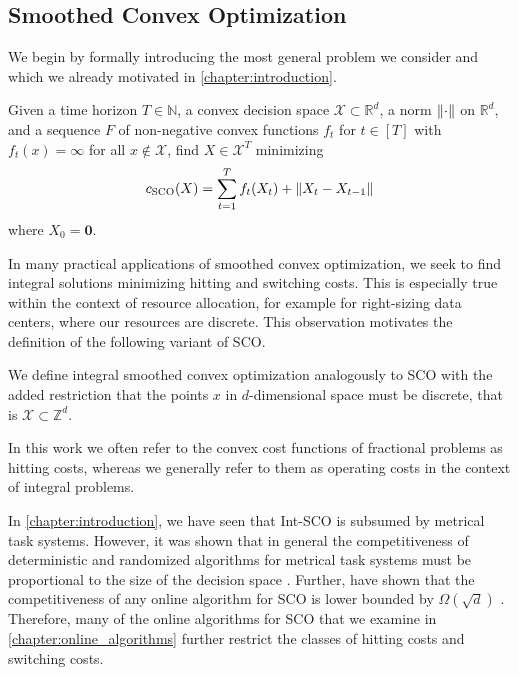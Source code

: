 \subsection{Smoothed Convex Optimization}

We begin by formally introducing the most general problem we consider and which we already motivated in \autoref{chapter:introduction}.

\begin{problem}
Given a time horizon $T \in \mathbb{N}$, a convex decision space $\mathcal{X} \subset \mathbb{R}^d$, a norm $\lVert\cdot\rVert$ on $\mathbb{R}^d$, and a sequence $F$ of non-negative convex functions $f_t$ for $t \in [T]$ with $f_t(x) = \infty$ for all $x \not\in \mathcal{X}$, find $X \in \mathcal{X}^T$ minimizing \begin{align*}
    c_{\text{SCO}}(X) = \sum_{t=1}^T f_t(X_t) + \lVert X_t - X_{t-1}\rVert
\end{align*}
where $X_0 = \mathbf{0}$.
\end{problem}

In many practical applications of smoothed convex optimization, we seek to find integral solutions minimizing hitting and switching costs. This is especially true within the context of resource allocation, for example for right-sizing data centers, where our resources are discrete. This observation motivates the definition of the following variant of SCO.

\begin{problem}
We define integral smoothed convex optimization analogously to SCO with the added restriction that the points $x$ in $d$-dimensional space must be discrete, that is $\mathcal{X} \subset \mathbb{Z}^d$.
\end{problem}

In this work we often refer to the convex cost functions of fractional problems as hitting costs, whereas we generally refer to them as operating costs in the context of integral problems.

In \autoref{chapter:introduction}, we have seen that Int-SCO is subsumed by metrical task systems. However, it was shown that in general the competitiveness of deterministic and randomized algorithms for metrical task systems must be proportional to the size of the decision space \cite{Blum1992, Borodin1992}. Further, \citeauthor*{Chen2018} have shown that the competitiveness of any online algorithm for SCO is lower bounded by $\Omega(\sqrt{d})$ \cite{Chen2018}. Therefore, many of the online algorithms for SCO that we examine in \autoref{chapter:online_algorithms} further restrict the classes of hitting costs and switching costs.

